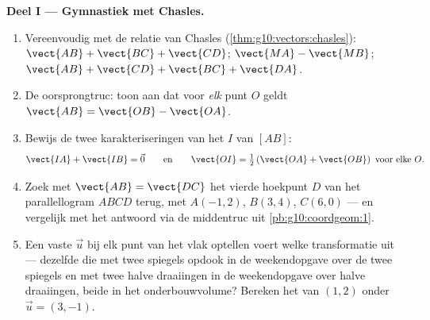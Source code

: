 \begin{problem}
\medskip
\noindent\textbf{Deel I --- Gymnastiek met Chasles.}
\begin{enumerate}
  \item Vereenvoudig met de relatie van Chasles
        (\cref{thm:g10:vectors:chasles}):
        $\vect{AB} + \vect{BC} + \vect{CD}$; \quad
        $\vect{MA} - \vect{MB}$; \quad
        $\vect{AB} + \vect{CD} + \vect{BC} + \vect{DA}$.
  \item De oorsprongtruc: toon aan dat voor \emph{elk} punt $O$ geldt
        $\vect{AB} = \vect{OB} - \vect{OA}$.
  \item Bewijs de twee karakteriseringen van het  $I$ van $[AB]$:
        \[
        \vect{IA} + \vect{IB} = \vec 0
        \qquad\text{en}\qquad
        \vect{OI} = \tfrac12\left(\vect{OA} + \vect{OB}\right)
        \ \text{voor elke } O .
        \]
  \item Zoek met $\vect{AB} = \vect{DC}$ het vierde hoekpunt $D$ van het
        parallellogram $ABCD$ terug, met $A(-1, 2)$, $B(3, 4)$, $C(6, 0)$ ---
        en vergelijk met het antwoord via de middentruc uit
        \cref{pb:g10:coordgeom:1}.
  \item Een vaste  $\vec u$ bij elk punt van het vlak optellen voert
        welke transformatie uit --- dezelfde die met twee spiegels opdook in
        de weekendopgave over de twee spiegels en met twee halve draaiingen
        in de weekendopgave over halve draaiingen, beide in het
        onderbouwvolume? Bereken het  van $(1, 2)$ onder
        $\vec u = (3, -1)$.
\end{enumerate}


\end{problem}
